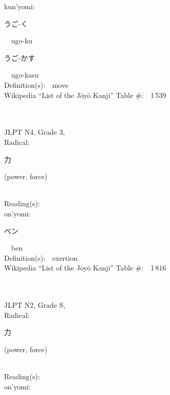 \begin{multicols}{2}
{\hspace*{1em}}kun'yomi:\ \ \\
{\hspace*{2em}}{\begin{CJK}{UTF8}{min} うご-く \end{CJK}}\ \ ugo-ku\ \ \\
{\hspace*{2em}}{\begin{CJK}{UTF8}{min} うご-かす \end{CJK}}\ \ ugo-kasu\ \ \\
Definition(s):\ \ move \\
Wikipedia ``List of the J\=oy\=o Kanji'' Table \#:\ \ 1\,539 \\
\ \ \\
{\fontsize{34pt}{40pt}  }\ \ \\  %
{JLPT N4, Grade 3, \\Radical:\ \ {\begin{CJK}{UTF8}{min} 力 \end{CJK}} (power, force) } \\
Reading(s):\ \ \\
{\hspace*{1em}}on'yomi:\ \ \\
{\hspace*{2em}}{\begin{CJK}{UTF8}{min} ベン \end{CJK}}\ \ ben\ \ \\
Definition(s):\ \ exertion \\
Wikipedia ``List of the J\=oy\=o Kanji'' Table \#:\ \ 1\,816 \\
\ \ \\
{\fontsize{34pt}{40pt}  }\ \ \\  %
{JLPT N2, Grade S, \\Radical:\ \ {\begin{CJK}{UTF8}{min} 力 \end{CJK}} (power, force) } \\
Reading(s):\ \ \\
{\hspace*{1em}}on'yomi:\ \ \\

\end{multicols}
